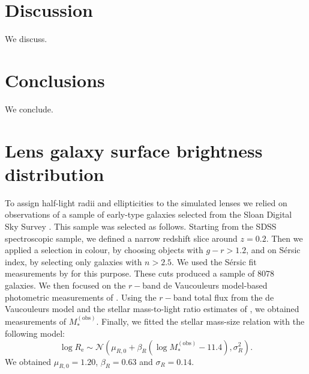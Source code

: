 \documentclass{aa}
\def\reff{R_{\mathrm{e}}}
\def\mobs{M_*^{(\mathrm{obs})}}
\begin{document}

\section{Discussion}\label{sect:discuss}

We discuss.


\section{Conclusions}\label{sect:concl}

We conclude.








\appendix
\section{Lens galaxy surface brightness distribution}\label{sect:appendixa}

To assign half-light radii and ellipticities to the simulated lenses we relied on observations of a sample of early-type galaxies selected from the Sloan Digital Sky Survey \citep[SDSS][]{Yor++00}.
This sample was selected as follows. Starting from the SDSS spectroscopic sample, we defined a narrow redshift slice around $z=0.2$. Then we applied a selection in colour, by choosing objects with $g-r>1.2$, and on S\'{e}rsic index, by selecting only galaxies with $n>2.5$. We used the S\'{e}rsic fit measurements by \citet{Mee++15} for this purpose. These cuts produced a sample of $8078$ galaxies.
We then focused on the $r-$band de Vaucouleurs model-based photometric measurements of \citet{Mee++15}.
Using the $r-$band total flux from the de Vaucouleurs model and the stellar mass-to-light ratio estimates of \citet{Men++14}, we obtained measurements of $\mobs$. Finally, we fitted the stellar mass-size relation with the following model:
\begin{equation}
\log{\reff} \sim \mathcal{N}(\mu_{R,0} + \beta_R(\log{\mobs} - 11.4), \sigma_R^2).
\end{equation}
We obtained $\mu_{R,0}=1.20$, $\beta_R=0.63$ and $\sigma_R=0.14$.
\end{document}

